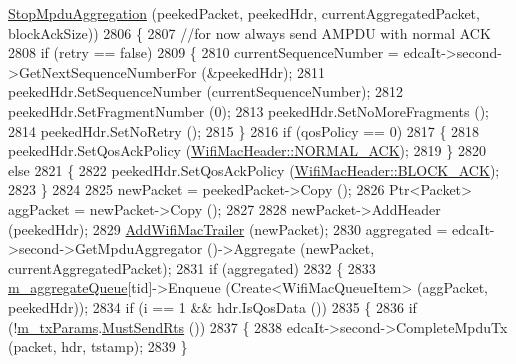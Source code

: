 \begin{DoxyCode}
      \hyperlink{classns3_1_1MacLow_aead5c738f9be3650b2b55a1a307029db}{StopMpduAggregation} (peekedPacket, peekedHdr, currentAggregatedPacket, blockAckSize))
2806                 \{
2807                   \textcolor{comment}{//for now always send AMPDU with normal ACK}
2808                   \textcolor{keywordflow}{if} (retry == \textcolor{keyword}{false})
2809                     \{
2810                       currentSequenceNumber = edcaIt->second->GetNextSequenceNumberFor (&peekedHdr);
2811                       peekedHdr.SetSequenceNumber (currentSequenceNumber);
2812                       peekedHdr.SetFragmentNumber (0);
2813                       peekedHdr.SetNoMoreFragments ();
2814                       peekedHdr.SetNoRetry ();
2815                     \}
2816                   \textcolor{keywordflow}{if} (qosPolicy == 0)
2817                     \{
2818                       peekedHdr.SetQosAckPolicy (\hyperlink{classns3_1_1WifiMacHeader_ae3a382482f357972019f5e1b3162adc4a9f52b9c6ca65d046ce2be9d70bce28cf}{WifiMacHeader::NORMAL\_ACK});
2819                     \}
2820                   \textcolor{keywordflow}{else}
2821                     \{
2822                       peekedHdr.SetQosAckPolicy (\hyperlink{classns3_1_1WifiMacHeader_ae3a382482f357972019f5e1b3162adc4a8d2763ea0083f1265fbf7dda6fdcf9fd}{WifiMacHeader::BLOCK\_ACK});
2823                     \}
2824 
2825                   newPacket = peekedPacket->Copy ();
2826                   Ptr<Packet> aggPacket = newPacket->Copy ();
2827 
2828                   newPacket->AddHeader (peekedHdr);
2829                   \hyperlink{classns3_1_1MacLow_acaafc67755f16f347e9161310d71e3ef}{AddWifiMacTrailer} (newPacket);
2830                   aggregated = edcaIt->second->GetMpduAggregator ()->Aggregate (newPacket, 
      currentAggregatedPacket);
2831                   \textcolor{keywordflow}{if} (aggregated)
2832                     \{
2833                       \hyperlink{classns3_1_1MacLow_a50ea30f5dff00a3ef2683b9275717c6f}{m\_aggregateQueue}[tid]->Enqueue (Create<WifiMacQueueItem> (aggPacket, 
      peekedHdr));
2834                       \textcolor{keywordflow}{if} (i == 1 && hdr.IsQosData ())
2835                         \{
2836                           \textcolor{keywordflow}{if} (!\hyperlink{classns3_1_1MacLow_a1c5ce6a0415d4a6d394bc9fc8f78327d}{m\_txParams}.\hyperlink{classns3_1_1MacLowTransmissionParameters_a84f6c50f9cbd717e5191e178ae05b331}{MustSendRts} ())
2837                             \{
2838                               edcaIt->second->CompleteMpduTx (packet, hdr, tstamp);
2839                             \}

\end{DoxyCode}
